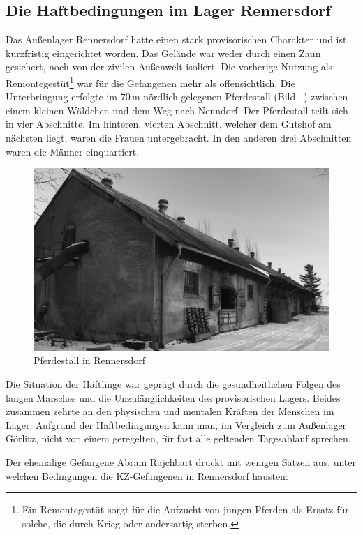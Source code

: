 \subsection{Die Haftbedingungen im Lager Rennersdorf}
Das Außenlager Rennersdorf hatte einen stark provisorischen Charakter und ist kurzfristig eingerichtet worden. Das Gelände war weder durch
einen Zaun gesichert, noch von der zivilen Außenwelt isoliert. Die vorherige Nutzung als Remontegestüt\footnote{Ein Remontegestüt sorgt für die Aufzucht von jungen Pferden als Ersatz für solche, die durch Krieg oder andersartig sterben.} war für die Gefangenen mehr als offensichtlich. Die Unterbringung erfolgte im 70\,m nördlich gelegenen Pferdestall (Bild ~) zwischen einem kleinen Wäldchen und dem Weg nach Neundorf.
Der Pferdestall teilt sich in vier Abschnitte. Im hinteren, vierten Abschnitt, welcher dem Gutshof am nächsten liegt, waren die Frauen untergebracht. In den anderen drei Abschnitten waren die Männer einquartiert.


\begin{figure}[htb]
    \includegraphics[width=\linewidth]{images/renn03}
    \caption[Der Pferdestall]{Pferdestall in Rennersdorf}
    \label{pferdestallfoto}
\end{figure}


Die Situation der Häftlinge war geprägt durch die gesundheitlichen Folgen des langen Marsches und die Unzulänglichkeiten des provisorischen Lagers. Beides zusammen zehrte an den physischen und mentalen Kräften der Menschen im Lager. Aufgrund der Haftbedingungen kann man, im Vergleich zum Außenlager Görlitz, nicht von einem geregelten, für fast alle geltenden Tagesablauf sprechen. 

Der ehemalige Gefangene Abram Rajchbart drückt mit wenigen Sätzen aus, unter welchen Bedingungen die KZ-Gefangenen in Rennersdorf hausten:

